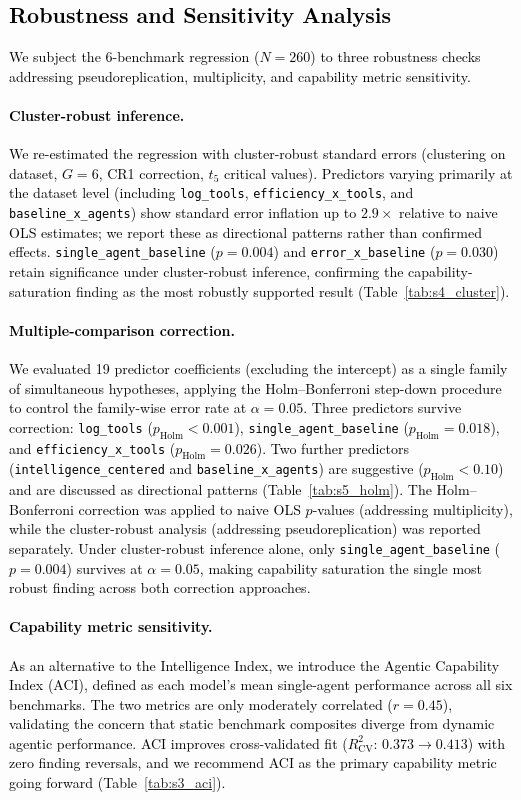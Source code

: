 \textcolor{black}{
\subsection{Robustness and Sensitivity Analysis}
\label{subsec:extended_validation}
We subject the 6-benchmark regression ($N=260$) to three robustness checks addressing pseudoreplication, multiplicity, and capability metric sensitivity.
\paragraph{Cluster-robust inference.} We re-estimated the regression with cluster-robust standard errors (clustering on dataset, $G=6$, CR1 correction, $t_5$ critical values). Predictors varying primarily at the dataset level (including \texttt{log\_tools}, \texttt{efficiency\_x\_tools}, and \texttt{baseline\_x\_agents}) show standard error inflation up to $2.9\times$ relative to naive OLS estimates; we report these as directional patterns rather than confirmed effects. \texttt{single\_agent\_baseline} ($p=0.004$) and \texttt{error\_x\_baseline} ($p=0.030$) retain significance under cluster-robust inference, confirming the capability-saturation finding as the most robustly supported result (Table~\ref{tab:s4_cluster}).
\paragraph{Multiple-comparison correction.} We evaluated 19 predictor coefficients (excluding the intercept) as a single family of simultaneous hypotheses, applying the Holm--Bonferroni step-down procedure to control the family-wise error rate at $\alpha=0.05$. Three predictors survive correction: \texttt{log\_tools} ($p_{\text{Holm}}<0.001$), \texttt{single\_agent\_baseline} ($p_{\text{Holm}}=0.018$), and \texttt{efficiency\_x\_tools} ($p_{\text{Holm}}=0.026$). Two further predictors (\texttt{intelligence\_centered} and \texttt{baseline\_x\_agents}) are suggestive ($p_{\text{Holm}}<0.10$) and are discussed as directional patterns (Table~\ref{tab:s5_holm}). The Holm--Bonferroni correction was applied to naive OLS $p$-values (addressing multiplicity), while the cluster-robust analysis (addressing pseudoreplication) was reported separately. Under cluster-robust inference alone, only \texttt{single\_agent\_baseline} ($p=0.004$) survives at $\alpha=0.05$, making capability saturation the single most robust finding across both correction approaches.
\paragraph{Capability metric sensitivity.} As an alternative to the Intelligence Index, we introduce the Agentic Capability Index (ACI), defined as each model's mean single-agent performance across all six benchmarks. The two metrics are only moderately correlated ($r = 0.45$), validating the concern that static benchmark composites diverge from dynamic agentic performance. ACI improves cross-validated fit ($R^2_{\text{CV}}$: $0.373 \to 0.413$) with zero finding reversals, and we recommend ACI as the primary capability metric going forward (Table~\ref{tab:s3_aci}).
}
